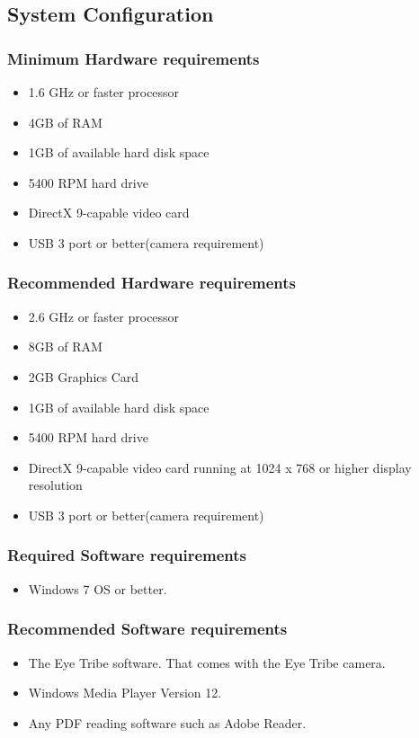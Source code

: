 \subsection{System Configuration}
\subsubsection{Minimum Hardware requirements}
\begin{itemize}
\item 1.6 GHz or faster processor
\item 4GB of RAM
\item 1GB of available hard disk space
\item 5400 RPM hard drive
\item DirectX 9-capable video card
\item USB 3 port or better(camera requirement)
\end{itemize}

\subsubsection{Recommended Hardware requirements}
\begin{itemize}
\item 2.6 GHz or faster processor
\item 8GB of RAM
\item 2GB Graphics Card
\item 1GB of available hard disk space
\item 5400 RPM hard drive
\item DirectX 9-capable video card running at 1024 x 768 or higher display resolution
\item USB 3 port or better(camera requirement)
\end{itemize}
\subsubsection{Required Software requirements}
\begin{itemize}
\item Windows 7 OS or better.
\end{itemize}
\subsubsection{Recommended Software requirements}
\begin{itemize}
\item The Eye Tribe software. That comes with the Eye Tribe camera.
\item Windows Media Player Version 12.
\item Any PDF reading software such as Adobe Reader.
\end{itemize}

